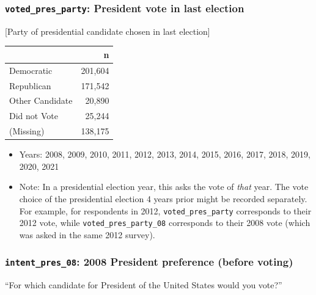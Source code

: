 \documentclass[10pt,article,oneside]{memoir}
\theoremstyle{definition}
\begin{document}
\hypertarget{voted_pres_party-president-vote-in-last-election}{%
\subsubsection{\texorpdfstring{\texttt{voted\_pres\_party}: President
vote in last
election}{voted\_pres\_party: President vote in last election}}\label{voted_pres_party-president-vote-in-last-election}}

{[}Party of presidential candidate chosen in last election{]}

\begin{table}[H]
\centering
\begin{tabular}[t]{lr}
\toprule
 & n\\
\midrule
Democratic & 201,604\\
Republican & 171,542\\
Other Candidate & 20,890\\
Did not Vote & 25,244\\
(Missing) & 138,175\\
\bottomrule
\end{tabular}
\end{table}

\begin{itemize}
\tightlist
\item
  Years: 2008, 2009, 2010, 2011, 2012, 2013, 2014, 2015, 2016, 2017,
  2018, 2019, 2020, 2021
\item
  Note: In a presidential election year, this asks the vote of
  \emph{that} year. The vote choice of the presidential election 4 years
  prior might be recorded separately. For example, for respondents in
  2012, \texttt{voted\_pres\_party} corresponds to their 2012 vote,
  while \texttt{voted\_pres\_party\_08} corresponds to their 2008 vote
  (which was asked in the same 2012 survey).
\end{itemize}

\hypertarget{intent_pres_08-2008-president-preference-before-voting}{%
\subsubsection{\texorpdfstring{\texttt{intent\_pres\_08}: 2008 President
preference (before
voting)}{intent\_pres\_08: 2008 President preference (before voting)}}\label{intent_pres_08-2008-president-preference-before-voting}}

``For which candidate for President of the United States would you
vote?''
\end{document}

